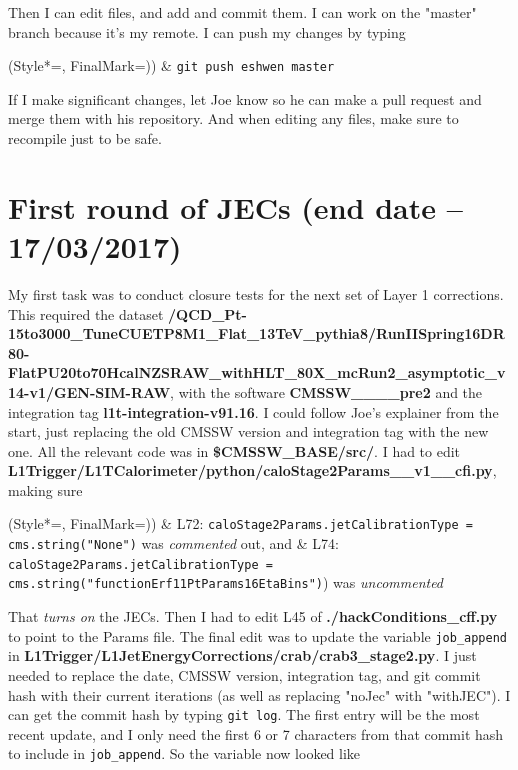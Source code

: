 Then I can edit files, and add and commit them. I can work on the "master" branch because it's my remote. I can push my changes by typing

\begin{easylist}
\ListProperties(Style*=, FinalMark={)})
& \texttt{git push eshwen master}
\end{easylist}

If I make significant changes, let Joe know so he can make a pull request and merge them with his repository. And when editing any files, make sure to recompile just to be safe.

\section{First round of JECs (end date -- 17/03/2017)}

My first task was to conduct closure tests for the next set of Layer 1 corrections. This required the dataset \textbf{/QCD\_\-Pt-15to3000\_\-TuneCUETP8M1\_\-Flat\_\-13TeV\_\-pythia8/RunIISpring16DR80-FlatPU20to70HcalNZSRAW\_\-withHLT\_\-80X\_\-mcRun2\_\-asymptotic\_\-v14-v1/GEN-SIM-RAW}, with the software \textbf{CMSSW\_\_\_\_\-pre2} and the integration tag \textbf{l1t-integration-v91.16}. I could follow Joe's explainer from the start, just replacing the old CMSSW version and integration tag with the new one. All the relevant code was in \textbf{\$CMSSW\_BASE/src/}. I had to edit \textbf{L1Trigger/L1TCalorimeter/python/caloStage2Params\_\_\-v1\_\_\-cfi.py}, making sure

\begin{easylist}
\ListProperties(Style*=, FinalMark={)})
& L72: \texttt{caloStage2Params.jetCalibrationType = cms.string("None")} was \emph{commented} out, and
& L74: \texttt{caloStage2Params.jetCalibrationType = cms.string("functionErf11PtParams16EtaBins")}) was \emph{uncommented}
\end{easylist}

That \emph{turns on} the JECs. Then I had to edit L45 of \textbf{./hackConditions\_\-cff.py} to point to the Params file. The final edit was to update the variable \texttt{job\_append} in \textbf{L1Trigger/L1JetEnergyCorrections/crab/crab3\_\-stage2.py}. I just needed to replace the date, CMSSW version, integration tag, and git commit hash with their current iterations (as well as replacing "noJec" with "withJEC"). I can get the commit hash by typing \texttt{git log}. The first entry will be the most recent update, and I only need the first 6 or 7 characters from that commit hash to include in \texttt{job\_append}. So the variable now looked like

